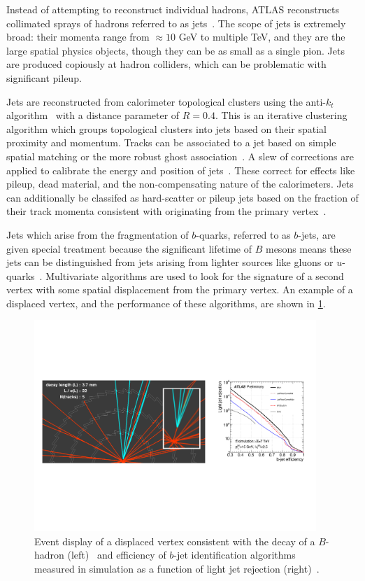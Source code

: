 Instead of attempting to reconstruct individual hadrons, ATLAS reconstructs collimated sprays of hadrons referred to as jets~\cite{PERF-2012-01}. The scope of jets is extremely broad: their momenta range from $\approx\!10$ GeV to multiple TeV, and they are the large spatial physics objects, though they can be as small as a single pion. Jets are produced copiously at hadron colliders, which can be problematic with significant pileup.

Jets are reconstructed from calorimeter topological clusters using the anti-$k_t$ algorithm~\cite{2008.antikt} with a distance parameter of $R=0.4$. This is an iterative clustering algorithm which groups topological clusters into jets based on their spatial proximity and momentum. Tracks can be associated to a jet based on simple spatial matching or the more robust ghost association~\cite{ATLAS-CONF-2013-083}. A slew of corrections are applied to calibrate the energy and position of jets~\cite{PERF-2012-01,ATLAS-CONF-2013-083}. These correct for effects like pileup, dead material, and the non-compensating nature of the calorimeters. Jets can additionally be classifed as hard-scatter or pileup jets based on the fraction of their track momenta consistent with originating from the primary vertex~\cite{ATLAS-CONF-2014-018}.

Jets which arise from the fragmentation of $b$-quarks, referred to as $b$-jets, are given special treatment because the significant lifetime of $B$ mesons means these jets can be distinguished from jets arising from lighter sources like gluons or $u$-quarks~\cite{ATLAS-CONF-2014-046}. Multivariate algorithms are used to look for the signature of a second vertex with some spatial displacement from the primary vertex. An example of a displaced vertex, and the performance of these algorithms, are shown in \cref{fig:objects-btag}.

\begin{figure}[tp]
  \centering
  \includegraphics[width=0.95\textwidth]{figures/performance/btag-ROC-display}
  \caption{Event display of a displaced vertex consistent with the decay of a $B$-hadron (left)~\cite{ATLAS-CONF-2010-004} and efficiency of $b$-jet identification algorithms measured in simulation as a function of light jet rejection (right)~\cite{ATLAS-CONF-2012-043}.}
  \label{fig:objects-btag}
\end{figure}

